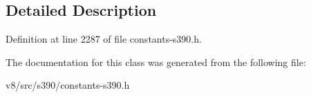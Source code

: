 \subsection{Detailed Description}


Definition at line 2287 of file constants-\/s390.\+h.



The documentation for this class was generated from the following file\+:\begin{DoxyCompactItemize}
\item 
v8/src/s390/constants-\/s390.\+h\end{DoxyCompactItemize}
